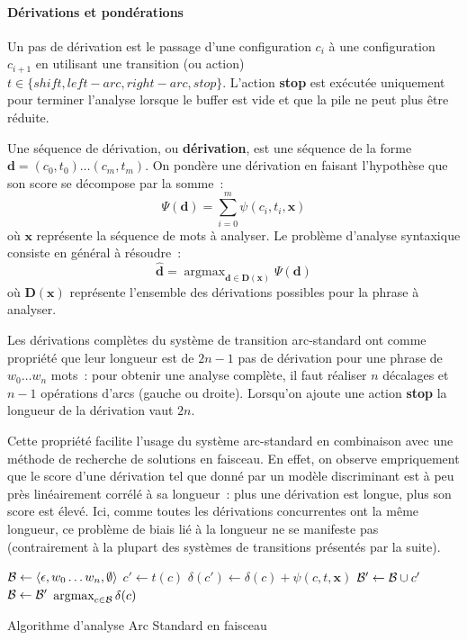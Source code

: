 \documentclass[11pt,openany]{book}
\begin{document}
\paragraph{Dérivations et pondérations} 
Un pas de dérivation est le passage d'une configuration $c_i$ à une
configuration $c_{i+1}$ en utilisant une transition (ou action) $t\in
\{shift, left-arc,right-arc, stop\}$. L'action {\bf stop} est exécutée
uniquement pour terminer l'analyse lorsque le buffer est vide et que
la pile ne peut plus être réduite.

Une séquence de dérivation, ou {\bf dérivation}, est une séquence de la
forme $\mathbf{d} = (c_0, t_0) \ldots (c_m,t_m)$. On pondère une dérivation en
faisant l'hypothèse que son score se décompose par la somme~:
\begin{equation}
\Psi(\mathbf{d}) = \sum_{i=0}^m  \psi(c_i,t_i,\mathbf{x})
\end{equation}
où $\mathbf{x}$ représente la séquence de mots à analyser.
Le problème d'analyse syntaxique consiste en général à résoudre~:
\begin{equation}
{\mathbf{\hat{d}}} = \mathop{\text{argmax}}_{\mathbf{d} \in \mathbf{D}(\mathbf{x})} \Psi(\mathbf{d}) 
\end{equation}
où $\mathbf{D}(\mathbf{x})$ représente l'ensemble des dérivations possibles pour
la phrase à analyser.

Les dérivations complètes du système de transition arc-standard ont comme
propriété que leur longueur est de $2n-1$ pas de dérivation pour une
phrase de $w_0\ldots w_n$ mots~:  pour obtenir une analyse complète,
il faut réaliser $n$ décalages et $n-1$ opérations d'arcs (gauche ou
droite).
Lorsqu'on ajoute une action {\bf stop} la longueur de la dérivation
vaut $2n$.

Cette propriété facilite l'usage du système arc-standard en
combinaison avec une méthode de recherche de solutions en faisceau.
En effet, on observe empriquement que le score d'une dérivation tel
que donné par un modèle discriminant est à peu près linéairement
corrélé à sa longueur~: plus une dérivation est longue, plus son score
est élevé. Ici, comme toutes les dérivations concurrentes ont la même
longueur, ce problème de biais lié à la longueur ne se manifeste pas
(contrairement à la plupart des systèmes de transitions présentés par la suite).

\begin{algorithm}[htbp]
\begin{algorithmic}[0]
\State ${\cal B} \gets \langle \epsilon, w_0\ldots w_n,\emptyset\rangle$
\State $c' \gets t(c)$
\State $\delta(c') \gets \delta(c) + \psi(c,t,\mathbf{x})$
\State ${\cal B}' \gets {\cal B}\cup c'$
\EndFor
\EndFor
\State ${\cal B} \gets {\cal B}'$
\EndFor
\State \Return $\mathop{\text{argmax}}_{c\in \cal B} \delta(c)$
\EndFunction
\end{algorithmic}
\caption{\label{algo-arc-standard}Algorithme d'analyse Arc Standard en
faisceau}
\end{algorithm}
\end{document}
